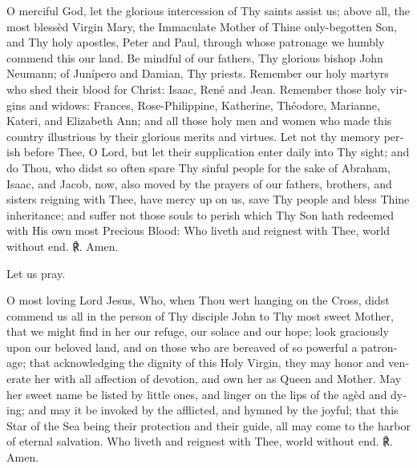\begin{otherlanguage}{english}


O merciful God, let the glorious intercession of Thy saints assist us; above all, the most blessèd Virgin Mary, the Immaculate Mother of Thine only-begotten Son, and Thy holy apostles, Peter and Paul, through whose patronage we humbly commend this our land. Be mindful of our fathers, Thy glorious bishop John Neumann; of Junípero and Damian, Thy priests. Remember our holy martyrs who shed their blood for Christ: Isaac, René and Jean. Remember those holy virgins and widows: Frances, Rose-Philippine, Katherine, Théodore, Marianne, Kateri, and Elizabeth Ann; and all those holy men and women who made this country illustrious by their glorious merits and virtues. Let not thy memory perish before Thee, O Lord, but let their supplication enter daily into Thy sight; and do Thou, who didst so often spare Thy sinful people for the sake of Abraham, Isaac, and Jacob, now, also moved by the prayers of our fathers, brothers, and sisters reigning with Thee, have mercy up on us, save Thy people and bless Thine inheritance; and suffer not those souls to perish which Thy Son hath redeemed with His own most Precious Blood: Who liveth and reignest with Thee, world without end. ℟. Amen.
\smallskip

Let us pray.

O most loving Lord Jesus, Who, when Thou wert hanging on the Cross, didst commend us all in the person of Thy disciple John to Thy most sweet Mother, that we might find in her our refuge, our solace and our hope; look graciously upon our beloved land, and on those who are bereaved of so powerful a patronage; that acknowledging the dignity of this Holy Virgin, they may honor and venerate her with all affection of devotion, and own her as Queen and Mother. May her sweet name be listed by little ones, and linger on the lips of the agèd and dying; and may it be invoked by the afflicted, and hymned by the joyful; that this Star of the Sea being their protection and their guide, all may come to the harbor of eternal salvation. Who liveth and reignest with Thee, world without end. ℟. Amen.\end{otherlanguage}